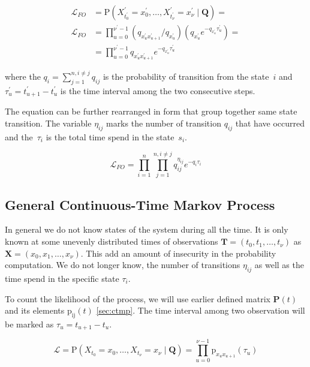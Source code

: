 \documentclass[thesis=M,english]{FITthesis}[2012/10/20]
\newcommand{\matr}[1]{\mathbf{#1}}
\begin{document}
\begin{equation}\label{eq:CL1}
\begin{aligned}
 \mathcal{L}_{FO} &= \mathrm{P}(X_{t_0^{'}}^{'} = x_0^{'}, \dots ,X_{t_{\nu}^{'}}^{'} = x_\nu^{'} \mid \matr{Q} ) = \\ 
 \mathcal{L}_{FO} &=  \prod_{u=0}^{\nu^{'}-1} ( q_{x_u^{'} x_{u+1}^{'}} / q_{x_u^{'}} )( q_{x_u^{'}} e^{ - q_{x_u^{'}} \tau_{u }^{'}}) = \\
    &= \prod_{u=0}^{\nu^{'}-1} q_{x_u^{'} x_{u+1}^{'}} e^{ - q_{x_u^{'}} \tau_{u}^{'}}
\end{aligned}
\end{equation}

where the $q_i = \sum_{j=1}^{n,i\neq j} q_{ij}$ is the probability of transition from the state~$i$ and   
$\tau_{u}^{'} = t_{u+1}^{'} - t_{u}^{'}$ is the time interval among the two consecutive steps.

The equation can be further rearranged in form that group together same state transition. The variable $\eta_{ij}$ marks the number of transition $q_{ij}$ that have occurred and the~$\tau_i$ is the total time spend in the state~$s_i$.

\begin{equation}\label{eq:CL2}
 \mathcal{L}_{FO} = \prod_{i=1}^{n} \prod_{j=1}^{n, i \neq j} q_{ij}^{\eta_{ij} } e^{ - q_i \tau_i }
\end{equation}

\subsection{ General Continuous-Time Markov Process }

In general we do not know states of the system during all the time. It is only known at some unevenly distributed times of observations $\matr{T} = ( t_0, t_1, \dots, t_{\nu} )$ as $\matr{X}= (x_0, x_1, \dots, x_{\nu} )$. 
This add an amount of insecurity in the probability computation. We do not longer know, the number of transitions $\eta_{ij}$ as well as the time spend in the specific state $\tau_i$. 

To count the likelihood of the process, we will use earlier defined matrix $\matr{P}(t)$ and its elements $\mathrm{p_{ij}}(t)$ \ref{sec:ctmp}. The time interval among two observation will be marked as  $\tau_u = t_{u+1} - t_u$.    

\begin{equation}
 \mathcal{L} = \mathrm{P}(X_{t_0} = x_0, \dots ,X_{t_\nu} = x_\nu \mid \matr{Q} ) = \prod_{u=0}^{\nu-1} \mathrm{p}_{x_u x_{u+1}}(\tau_u) 
\end{equation}
\end{document}
